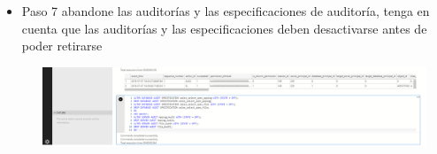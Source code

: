 \begin{itemize}
   	      \item Paso 7 abandone las auditorías y las especificaciones de auditoría, tenga en cuenta que las auditorías y las especificaciones deben desactivarse antes de poder retirarse
				 
				 	
					\begin{center}
    				\includegraphics[width=16cm, height=90]{./Imagenes/ImagenlV33}
   				    \end{center}
   				    
\end{itemize}
\clearpage	
			

\\\\




